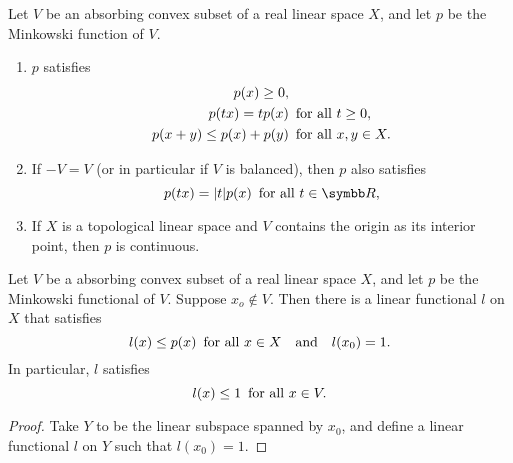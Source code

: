 \begin{proposition}
  Let $V$ be an absorbing convex subset of a real linear space $X$, and let $p$ be the Minkowski function of $V$.
  \begin{enumerate}
    \item $p$ satisfies
    \begin{equation*}
      \begin{aligned}
        p(x)\geq 0,&\\
        p(tx)=tp(x) &\text{\enskip for all }t\geq 0,\\
        p(x+y)\leq p(x)+p(y) &\text{\enskip for all } x, y\in X.
      \end{aligned}
    \end{equation*}
    \item If $-V=V$ (or in particular if $V$ is balanced), then $p$ also satisfies
    \begin{equation*}
      p(tx)=\ABS tp(x)\text{\enskip for all }t\in\RR,
    \end{equation*}
    \item If $X$ is a topological linear space and $V$ contains the origin as its interior point, then $p$ is continuous.
  \end{enumerate}
\end{proposition}

\begin{theorem}
  Let $V$ be a absorbing convex subset of a real linear space $X$, and let $p$ be the Minkowski functional of $V$. Suppose $x_o\notin V$. Then there is a linear functional $l$ on $X$ that satisfies
  \begin{equation*}
    l(x)\leq p(x)\text{\enskip for all }x\in X\text{\quad and\quad}l(x_0)=1.
  \end{equation*}
  In particular, $l$ satisfies
  \begin{equation*}
    l(x)\leq 1\text{\enskip for all }x\in V.
  \end{equation*}
\end{theorem}

\begin{proof}
  Take $Y$ to be the linear subspace spanned by $x_0$, and define a linear functional $l$ on $Y$ such that $l(x_0)=1$.
\end{proof}

